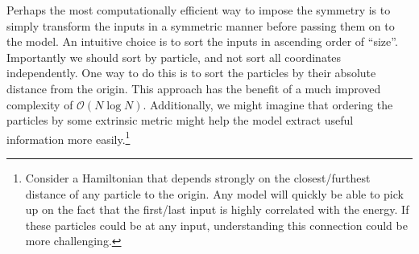 \documentclass[Thesis.tex]{subfiles}
\begin{document}
Perhaps the most computationally efficient way to impose the symmetry is to
simply transform the inputs in a symmetric manner before passing them on to the
model. An intuitive choice is to sort the inputs in ascending order of ``size''.
Importantly we should sort by particle, and not sort all coordinates
independently. One way to do this is to sort the particles by their absolute
distance from the origin. This approach has the benefit of a much improved
complexity of $\mathcal{O}(N\log N)$. Additionally, we might
imagine that ordering the particles by some extrinsic metric might help the
model extract useful information more easily.\footnote{Consider a Hamiltonian
  that depends strongly on the closest/furthest distance of any particle to the
  origin. Any model will quickly be able to pick up on the fact that the
  first/last input is highly correlated with the energy. If these particles
  could be at any input, understanding this connection could be more
  challenging.}\\
\end{document}
